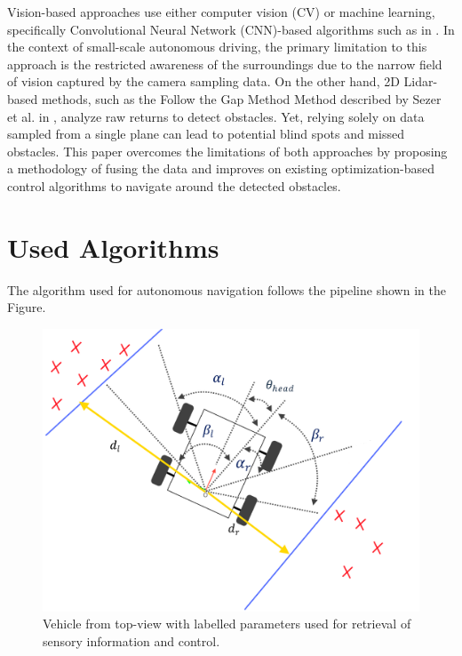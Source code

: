 \documentclass[conference]{IEEEtran}
\begin{document}
Vision-based approaches use either computer vision (CV) or machine learning, specifically Convolutional Neural Network (CNN)-based algorithms such as in \cite{b3}. In the context of small-scale autonomous driving, the primary limitation to this approach is the restricted awareness of the surroundings due to the narrow field of vision captured by the camera sampling data. On the other hand, 2D Lidar-based methods, such as the Follow the Gap Method Method described by Sezer et al. in \cite{b4}, analyze raw returns to detect obstacles. Yet, relying solely on data sampled from a single plane can lead to potential blind spots and missed obstacles. This paper overcomes the limitations of both approaches by proposing a methodology of fusing the data and improves on existing optimization-based control algorithms to navigate around the detected obstacles.

\section{Used Algorithms}
The algorithm used for autonomous navigation follows the pipeline shown in the Figure.   

\begin{figure}
    \centering
    \includegraphics[scale=0.2]{diagram.png}
    \caption{Vehicle from top-view with labelled parameters used for retrieval of sensory information and control.}
    \label{Figure 2}
\end{figure}
\end{document}
